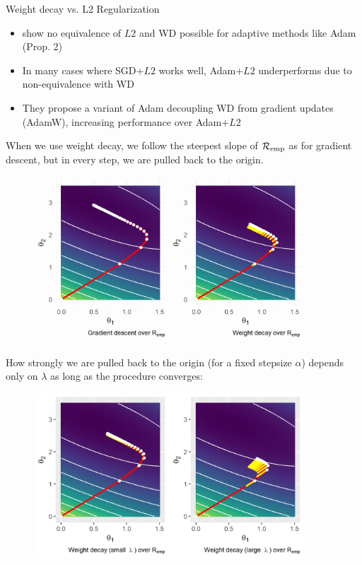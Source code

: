 \documentclass[11pt,compress,t,notes=noshow, xcolor=table]{beamer}
\begin{document}
\begin{vbframe}{Weight decay vs. L2 Regularization}
\begin{itemize}
    \item {} show no equivalence of $L2$ and WD possible for adaptive methods like Adam (Prop. 2)
    \item In many cases where SGD+$L2$ works well, Adam+$L2$ underperforms due to non-equivalence with WD
    \item They propose a variant of Adam decoupling WD from gradient updates (AdamW), increasing performance over Adam+$L2$
\end{itemize}



\framebreak

When we use weight decay, we follow the steepest slope of $\mathcal{R}_{\text{emp}}$ as for gradient descent, but in every step, we are pulled back to the origin.

\begin{figure}
\includegraphics[width=0.9\textwidth]{figure/graddes_vs_weightdecay.png}\\
\end{figure}


\framebreak

How strongly we are pulled back to the origin (for a fixed stepsize $\alpha$) depends only on $\lambda$ as long as the procedure converges:

\begin{figure}
\includegraphics[width=0.9\textwidth]{figure/weightdecay_lambda_plot.png}\\
\end{figure}


\end{vbframe}


\endlecture
\end{document}
